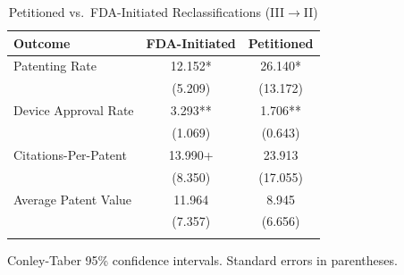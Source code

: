 \begin{table}[htbp]
\centering
\caption{Petitioned vs.\ FDA-Initiated Reclassifications (III$\to$II)}
\label{tab:petitioned_vs_fda}
\begin{tabular}{lcc}
\toprule
Outcome & FDA-Initiated & Petitioned \\
\midrule
Patenting Rate & 12.152* & 26.140* \\ 
 & (5.209) & (13.172) \\ 
\addlinespace
Device Approval Rate & 3.293** & 1.706** \\ 
 & (1.069) & (0.643) \\ 
\addlinespace
Citations-Per-Patent & 13.990+ & 23.913 \\ 
 & (8.350) & (17.055) \\ 
\addlinespace
Average Patent Value & 11.964 & 8.945 \\ 
 & (7.357) & (6.656) \\ 
\addlinespace
\bottomrule
\end{tabular}
\begin{tablenotes}\small
\item Conley-Taber 95\% confidence intervals. Standard errors in parentheses.
\end{tablenotes}
\end{table}